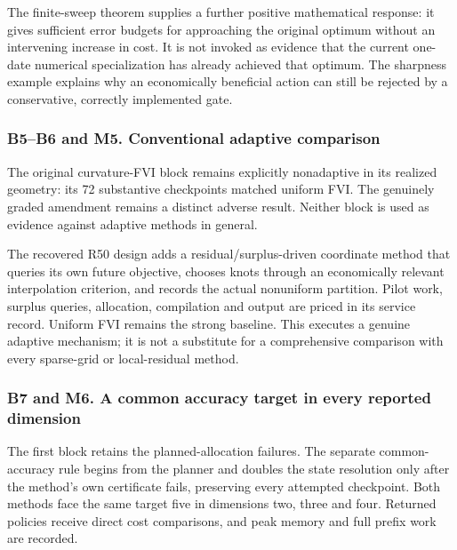 The finite-sweep theorem supplies a further positive mathematical
response: it gives sufficient error budgets for approaching the original
optimum without an intervening increase in cost. It is not invoked as
evidence that the current one-date numerical specialization has already
achieved that optimum. The sharpness example explains why an
economically beneficial action can still be rejected by a conservative,
correctly implemented gate.

\hypertarget{b5b6-and-m5.-conventional-adaptive-comparison}{%
\subsubsection{B5--B6 and M5. Conventional adaptive
comparison}\label{b5b6-and-m5.-conventional-adaptive-comparison}}

The original curvature-FVI block remains explicitly nonadaptive in its
realized geometry: its 72 substantive checkpoints matched uniform FVI.
The genuinely graded amendment remains a distinct adverse result.
Neither block is used as evidence against adaptive methods in general.

The recovered R50 design adds a residual/surplus-driven coordinate
method that queries its own future objective, chooses knots through an
economically relevant interpolation criterion, and records the actual
nonuniform partition. Pilot work, surplus queries, allocation,
compilation and output are priced in its service record. Uniform FVI
remains the strong baseline. This executes a genuine adaptive mechanism;
it is not a substitute for a comprehensive comparison with every
sparse-grid or local-residual method.

\hypertarget{b7-and-m6.-a-common-accuracy-target-in-every-reported-dimension}{%
\subsubsection{B7 and M6. A common accuracy target in every reported
dimension}\label{b7-and-m6.-a-common-accuracy-target-in-every-reported-dimension}}

The first block retains the planned-allocation failures. The separate
common-accuracy rule begins from the planner and doubles the state
resolution only after the method's own certificate fails, preserving
every attempted checkpoint. Both methods face the same target five in
dimensions two, three and four. Returned policies receive direct cost
comparisons, and peak memory and full prefix work are recorded.

